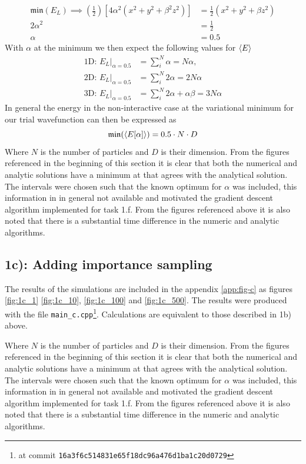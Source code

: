 \begin{align}
\mathfrak{min}(E_L)  \implies \left(\frac{1}{2}\right)[4\alpha^2 (x^2 + y^2 + \beta^2 z^2) ] &= \frac{1}{2} (x^2 + y^2 + \beta z^2) \\
 2 \alpha ^2  &= \frac{1}{2} \\
 \alpha &= 0.5
\end{align}
With $\alpha$ at the minimum we then expect the following values for $\langle E \rangle$
\begin{equation}
\begin{split}
\text{1D: }E_L |_{\alpha = 0.5} &= \sum_i^N \alpha = N \alpha,\\
\text{2D: }E_L|_{\alpha = 0.5} &= \sum_i^N  2\alpha = 2N \alpha \\
\text{3D: }E_L|_{\alpha = 0.5} &= \sum_i^N  2\alpha + \alpha \beta  = 3N\alpha
\end{split}
\end{equation}
In general the energy in the non-interactive case at the variational minimum for our trial wavefunction can then be expressed as 
\begin{equation}
\mathfrak{min}(\langle E[\alpha] \rangle) = 0.5 \cdot N \cdot D  
\end{equation}
Where $N$ is the number of particles and $D$ is their dimension. From the figures referenced in the beginning of this section it is clear that both the numerical and analytic solutions have a minimum at that  agrees with the analytical solution. The intervals  were chosen such that the known optimum for $\alpha$ was included, this information in in general not available and motivated the gradient descent algorithm implemented for task 1.f. From the figures referenced above it is also noted that there is a substantial time difference in the numeric and analytic algorithms. 

\subsection*{\textbf{1c):} Adding importance sampling}

The results of the simulations are included in the appendix \ref{app:fig-c} as figures \ref{fig:1c_1} \ref{fig:1c_10}, \ref{fig:1c_100} and \ref{fig:1c_500}. The results were produced with the file \lstinline{main_c.cpp}\footnote{at commit \lstinline{16a3f6c514831e65f18dc96a476d1ba1c20d0729}}. Calculations are equivalent to those described in 1b) above.



Where $N$ is the number of particles and $D$ is their dimension. From the figures referenced in the beginning of this section it is clear that both the numerical and analytic solutions have a minimum at that  agrees with the analytical solution. The intervals  were chosen such that the known optimum for $\alpha$ was included, this information in in general not available and motivated the gradient descent algorithm implemented for task 1.f. From the figures referenced above it is also noted that there is a substantial time difference in the numeric and analytic algorithms. 

